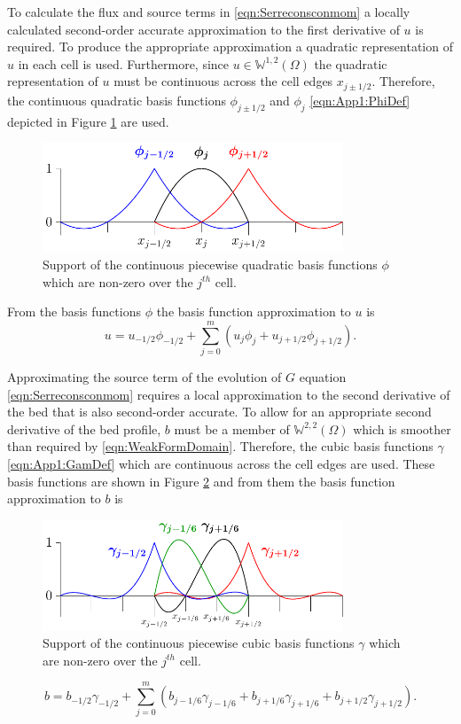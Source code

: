 To calculate the flux and source terms in \eqref{eqn:Serreconsconmom} a locally calculated second-order accurate approximation to the first derivative of $u$ is required. To produce the appropriate approximation a quadratic representation of $u$ in each cell is used. Furthermore, since $u\in\mathbb{W}^{1,2}(\Omega)$ the quadratic representation of $u$ must be continuous across the cell edges $x_{j \pm 1/2}$. Therefore, the continuous quadratic basis functions $\phi_{j\pm1/2} $ and $\phi_{j}$ \eqref{eqn:App1:PhiDef} depicted in Figure \ref{fig:P2ContBasis} are used.
\begin{figure}
	\centering
	\includegraphics[width=0.8\textwidth]{./chp3/figures/P2.pdf}
	\caption{Support of the continuous piecewise quadratic basis functions $\phi$ which are non-zero over the $j^{th}$ cell.}
	\label{fig:P2ContBasis}
\end{figure}

From the basis functions $\phi$ the basis function approximation to $u$ is
\begin{equation}
u = u_{-1/2}\phi_{-1/2} + \sum_{j=0}^m \left( u_{j}\phi_{j} + u_{j+1/2}\phi_{j+1/2} \right).
\label{eqn:FEapproxtou}
\end{equation}

Approximating the source term of the evolution of $G$ equation \eqref{eqn:Serreconsconmom} requires a local approximation to the second derivative of the bed that is also second-order accurate. To allow for an appropriate second derivative of the bed profile, $b$ must be a member of $\mathbb{W}^{2,2}(\Omega)$ which is smoother than required by \eqref{eqn:WeakFormDomain}. Therefore, the cubic basis functions $\gamma$ \eqref{eqn:App1:GamDef} which are continuous across the cell edges are used. These basis functions are shown in Figure \ref{fig:P3ContBasis} and from them the basis function approximation to $b$ is
\begin{figure}
	\centering
	\includegraphics[width=0.8\textwidth]{./chp3/figures/P3.pdf}
	\caption{Support of the continuous piecewise cubic basis functions $\gamma$ which are non-zero over the $j^{th}$ cell.}
	\label{fig:P3ContBasis}
\end{figure}
\begin{equation}
b = b_{-1/2}\gamma_{-1/2} +  \sum_{j=0}^m \left(b_{j-1/6}\gamma_{j-1/6}  + b_{j+1/6}\gamma_{j+1/6} + b_{j+1/2}\gamma_{j+1/2} \right).
\label{eqn:FEapproxtob}
\end{equation}

